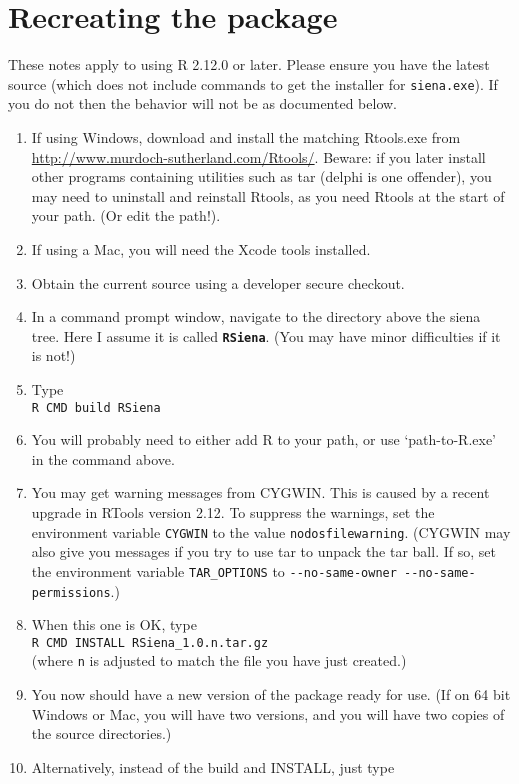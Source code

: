 \documentclass[12pt, a4paper]{article}
\renewcommand{\=}{\,=\,}
\newcommand{\+}{\,+\,}
\newcommand{\sfn}[1]{\textbf{\texttt{#1}}}
\begin{document}
\section{Recreating the package}
These notes apply to using R 2.12.0 or later. Please ensure you have the
latest source (which does not include commands to get the installer for
\verb|siena.exe|). If you do not then the behavior will not be as documented
below.
\begin{enumerate}
\item If using Windows, download and install the matching
\textsf{Rtools.exe} from
  \url{http://www.murdoch-sutherland.com/Rtools/}.  Beware: if you later install
  other programs containing utilities such as tar (delphi is one offender), you
  may need to uninstall and reinstall Rtools, as you need Rtools at the start of
  your path. (Or edit the path!).
\item If using a Mac, you will need the Xcode tools installed.
\item Obtain the current source using a developer secure checkout.
\item In a command prompt window, navigate to the directory above the siena
  tree. Here I assume it is called \sfn{RSiena}. (You may have minor
  difficulties if it is not!)
\item Type\\
\verb|R CMD build RSiena|
\item You will probably need to either add R to your path, or use
  `path-to-R.exe' in the command above.
\item You may get warning messages from CYGWIN. This is caused by a recent
  upgrade in RTools version 2.12. To suppress the warnings, set the environment
  variable \verb|CYGWIN| to the value \verb|nodosfilewarning|. (CYGWIN may also
  give you messages if you try to use tar to unpack the tar ball. If so,
  set the environment variable \verb|TAR_OPTIONS| to
\verb|--no-same-owner --no-same-permissions|.)
\item When this one is OK, type\\
\verb|R CMD INSTALL RSiena_1.0.n.tar.gz|\\
(where \verb|n| is adjusted to match the file you have just created.)
\item You now should have a new version of the package ready for use. (If on 64
  bit Windows or Mac, you will have two versions, and you will have two copies
  of the source directories.)
\item Alternatively, instead of the build and INSTALL, just type

\end{enumerate}
\end{document}
